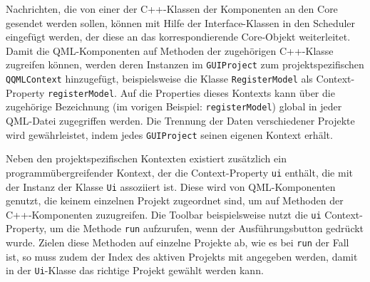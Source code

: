 Nachrichten, die von einer der C++-Klassen der Komponenten an den Core gesendet
werden sollen, können mit Hilfe der Interface-Klassen in den Scheduler eingefügt
werden, der diese an das korrespondierende Core-Objekt weiterleitet. Damit die
QML-Komponenten auf Methoden der zugehörigen C++-Klasse zugreifen können, werden
deren Instanzen im \texttt{GUIProject} zum projektspezifischen
\texttt{QQMLContext} hinzugefügt, beispielsweise die Klasse
\texttt{RegisterModel} als Context-Property \texttt{registerModel}. Auf die
Properties dieses Kontexts kann über die zugehörige Bezeichnung (im vorigen
Beispiel: \texttt{registerModel}) global in jeder QML-Datei zugegriffen werden.
Die Trennung der Daten verschiedener Projekte wird gewährleistet, indem jedes
\texttt{GUIProject} seinen eigenen Kontext erhält.

Neben den projektspezifischen Kontexten existiert zusätzlich ein
programmübergreifender Kontext, der die Context-Property \texttt{ui} enthält,
die mit der Instanz der Klasse \texttt{Ui} assoziiert ist. Diese wird von
QML-Komponenten genutzt, die keinem einzelnen Projekt zugeordnet sind, um auf
Methoden der C++-Komponenten zuzugreifen. Die Toolbar beispielsweise nutzt die
\texttt{ui} Context-Property, um die Methode \texttt{run} aufzurufen, wenn der
Ausführungsbutton gedrückt wurde. Zielen diese Methoden auf einzelne Projekte
ab, wie es bei \texttt{run} der Fall ist, so muss zudem der Index des aktiven
Projekts mit angegeben werden, damit in der \texttt{Ui}-Klasse das richtige
Projekt gewählt werden kann.
